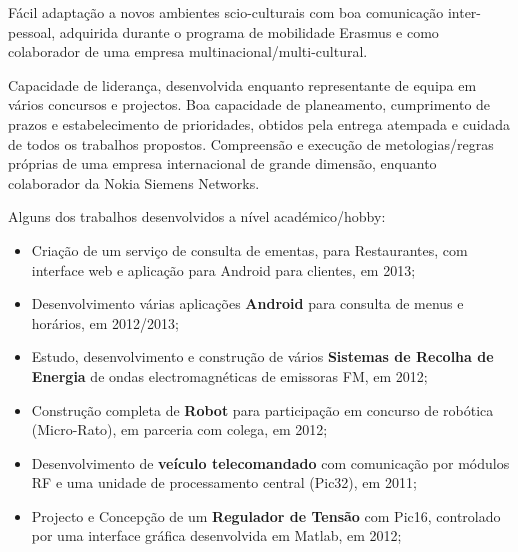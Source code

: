 \documentclass[15pt,helvetica,openbib,totpages,portuguese]{europecv}
\begin{document}
\begin{europecv}
{Fácil adaptação a novos ambientes scio-culturais com boa comunicação inter-pessoal, adquirida durante o programa de mobilidade Erasmus e como colaborador de uma empresa multinacional/multi-cultural.}


{Capacidade de liderança, desenvolvida enquanto representante de equipa em vários concursos e projectos.
\newline
Boa capacidade de planeamento, cumprimento de prazos e estabelecimento de prioridades, obtidos pela entrega atempada e cuidada de todos os trabalhos propostos.
\newline
Compreensão e execução de metologias/regras próprias de uma empresa internacional de grande dimensão, enquanto colaborador da Nokia Siemens Networks.}

{Alguns dos trabalhos desenvolvidos a nível académico/hobby:
\begin{itemize}
	\item Criação de um serviço de consulta de ementas, para Restaurantes, com interface web e aplicação para Android para clientes, em 2013;
	\item Desenvolvimento várias aplicações \textbf{Android} para consulta de menus e horários, em 2012/2013;
	\item Estudo, desenvolvimento e construção de vários \textbf{Sistemas de Recolha de Energia} de ondas electromagnéticas de emissoras FM, em 2012;
	\item Construção completa de \textbf{Robot} para participação em concurso de robótica (Micro-Rato), em parceria com colega, em 2012;
	\item Desenvolvimento de \textbf{veículo telecomandado} com comunicação por módulos RF e uma unidade de processamento central (Pic32), em 2011;
	\item Projecto e Concepção de um \textbf{Regulador de Tensão} com Pic16, controlado por uma interface gráfica desenvolvida em Matlab, em 2012;
\end{itemize}
}


\end{europecv}
\end{document}
